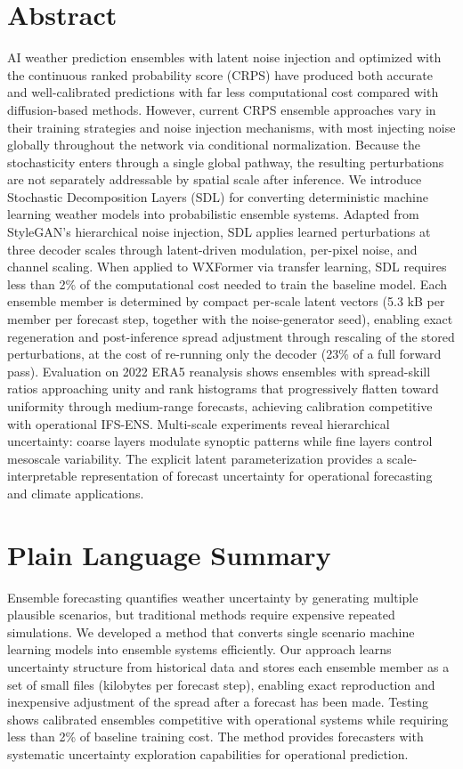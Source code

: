 \documentclass{agujournal2019}
\begin{document}
\section*{Abstract}
AI weather prediction ensembles with latent noise injection and optimized with the continuous ranked probability score (CRPS) have produced both accurate and well-calibrated predictions with far less computational cost compared with diffusion-based methods. However, current CRPS ensemble approaches vary in their training strategies and noise injection mechanisms, with most injecting noise globally throughout the network via conditional normalization. Because the stochasticity enters through a single global pathway, the resulting perturbations are not separately addressable by spatial scale after inference. We introduce Stochastic Decomposition Layers (SDL) for converting deterministic machine learning weather models into probabilistic ensemble systems. Adapted from StyleGAN's hierarchical noise injection, SDL applies learned perturbations at three decoder scales through latent-driven modulation, per-pixel noise, and channel scaling. When applied to WXFormer via transfer learning, SDL requires less than 2\% of the computational cost needed to train the baseline model. Each ensemble member is determined by compact per-scale latent vectors (5.3 kB per member per forecast step, together with the noise-generator seed), enabling exact regeneration and post-inference spread adjustment through rescaling of the stored perturbations, at the cost of re-running only the decoder (23\% of a full forward pass). Evaluation on 2022 ERA5 reanalysis shows ensembles with spread-skill ratios approaching unity and rank histograms that progressively flatten toward uniformity through medium-range forecasts, achieving calibration competitive with operational IFS-ENS. Multi-scale experiments reveal hierarchical uncertainty: coarse layers modulate synoptic patterns while fine layers control mesoscale variability. The explicit latent parameterization provides a scale-interpretable representation of forecast uncertainty for operational forecasting and climate applications.

\section*{Plain Language Summary}
Ensemble forecasting quantifies weather uncertainty by generating multiple plausible scenarios, but traditional methods require expensive repeated simulations. We developed a method that converts single scenario machine learning models into ensemble systems efficiently. Our approach learns uncertainty structure from historical data and stores each ensemble member as a set of small files (kilobytes per forecast step), enabling exact reproduction and inexpensive adjustment of the spread after a forecast has been made. Testing shows calibrated ensembles competitive with operational systems while requiring less than 2\% of baseline training cost. The method provides forecasters with systematic uncertainty exploration capabilities for operational prediction.
\end{document}
